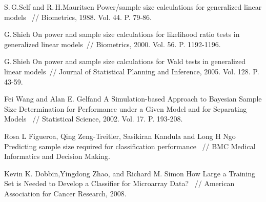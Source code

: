 \documentclass[12pt, a4paper]{scrartcl}
\theoremstyle{plain}
\theoremstyle{definition}
\begin{document}
\newpage
\begin{thebibliography}{1}

S.\,G.\;Self and R.\,H.\;Mauritsen Power/sample size calculations for generalized linear
models ~// Biometrics, 1988. Vol. 44. P. 79-86. 

G.\,Shieh On power and sample size calculations for likelihood ratio tests in generalized
linear models~// Biometrics, 2000. Vol. 56. P. 1192-1196.

G.\,Shieh On power and sample size calculations for Wald tests in generalized linear
models~// Journal of Statistical Planning and Inference, 2005. Vol. 128. P. 43-59.


Fei Wang and Alan E. Gelfand A Simulation-based Approach to Bayesian Sample Size
Determination for Performance under a Given Model and for Separating Models ~// Statistical Science, 2002. Vol. 17. P. 193-208.

Rosa L Figueroa, Qing Zeng-Treitler, Sasikiran Kandula and Long H Ngo Predicting sample size required for classification
performance ~// BMC Medical Informatics and Decision Making.

Kevin K. Dobbin,Yingdong Zhao, and Richard M. Simon How Large a Training Set is Needed to Develop a Classifier for Microarray Data? ~// American Association for Cancer Research, 2008.

\end{thebibliography}
\end{document}
